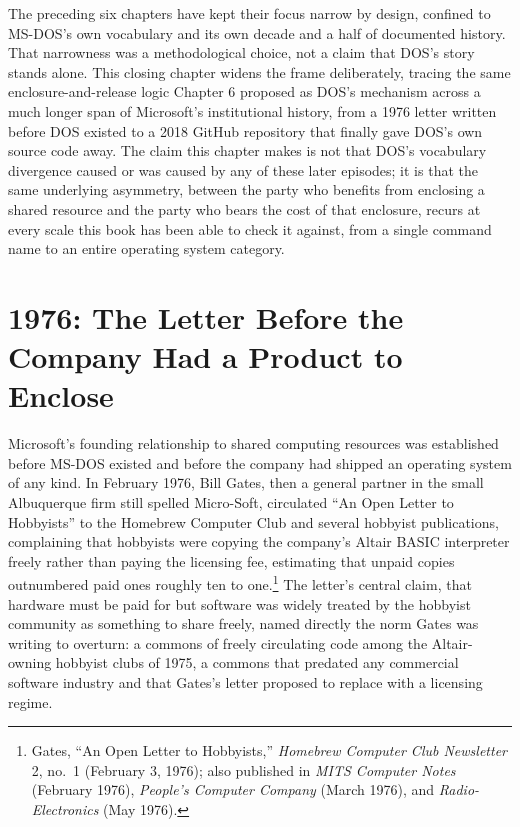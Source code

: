 \documentclass[11pt]{book}
\begin{document}
The preceding six chapters have kept their focus narrow by design, confined to MS-DOS's own vocabulary and its own decade and a half of documented history. That narrowness was a methodological choice, not a claim that DOS's story stands alone. This closing chapter widens the frame deliberately, tracing the same enclosure-and-release logic Chapter 6 proposed as DOS's mechanism across a much longer span of Microsoft's institutional history, from a 1976 letter written before DOS existed to a 2018 GitHub repository that finally gave DOS's own source code away. The claim this chapter makes is not that DOS's vocabulary divergence caused or was caused by any of these later episodes; it is that the same underlying asymmetry, between the party who benefits from enclosing a shared resource and the party who bears the cost of that enclosure, recurs at every scale this book has been able to check it against, from a single command name to an entire operating system category.

\section{1976: The Letter Before the Company Had a Product to Enclose}

Microsoft's founding relationship to shared computing resources was established before MS-DOS existed and before the company had shipped an operating system of any kind. In February 1976, Bill Gates, then a general partner in the small Albuquerque firm still spelled Micro-Soft, circulated \enquote{An Open Letter to Hobbyists} to the Homebrew Computer Club and several hobbyist publications, complaining that hobbyists were copying the company's Altair BASIC interpreter freely rather than paying the licensing fee, estimating that unpaid copies outnumbered paid ones roughly ten to one.\footnote{Gates, \enquote{An Open Letter to Hobbyists,} \emph{Homebrew Computer Club Newsletter} 2, no.\ 1 (February 3, 1976); also published in \emph{MITS Computer Notes} (February 1976), \emph{People's Computer Company} (March 1976), and \emph{Radio-Electronics} (May 1976).} The letter's central claim, that hardware must be paid for but software was widely treated by the hobbyist community as something to share freely, named directly the norm Gates was writing to overturn: a commons of freely circulating code among the Altair-owning hobbyist clubs of 1975, a commons that predated any commercial software industry and that Gates's letter proposed to replace with a licensing regime.
\end{document}
